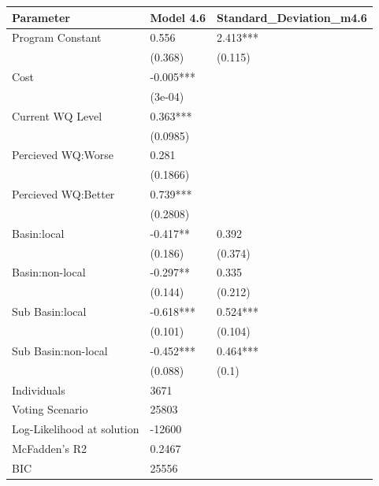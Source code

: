 \begin{table}[ht]
\centering
\begin{tabular}{lll}
  \hline
Parameter & Model 4.6 & Standard\_Deviation\_m4.6 \\ 
  \hline
Program Constant & 0.556 & 2.413*** \\ 
   & (0.368) & (0.115) \\ 
  Cost & -0.005*** &  \\ 
   & (3e-04) &  \\ 
  Current WQ Level & 0.363*** &  \\ 
   & (0.0985) &  \\ 
  Percieved WQ:Worse & 0.281 &  \\ 
   & (0.1866) &  \\ 
  Percieved WQ:Better & 0.739*** &  \\ 
   & (0.2808) &  \\ 
  Basin:local & -0.417** & 0.392 \\ 
   & (0.186) & (0.374) \\ 
  Basin:non-local & -0.297** & 0.335 \\ 
   & (0.144) & (0.212) \\ 
  Sub Basin:local & -0.618*** & 0.524*** \\ 
   & (0.101) & (0.104) \\ 
  Sub Basin:non-local & -0.452*** & 0.464*** \\ 
   & (0.088) & (0.1) \\ 
  Individuals & 3671 &  \\ 
  Voting Scenario & 25803 &  \\ 
  Log-Likelihood at solution & -12600 &  \\ 
  McFadden’s R2 & 0.2467 &  \\ 
  BIC & 25556 &  \\ 
   \hline
\end{tabular}
\end{table}
